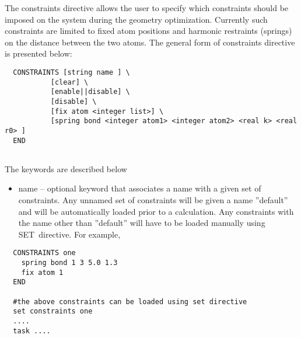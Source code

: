 \label{sec:constraints}

The constraints directive  allows the user to specify which constraints
should be imposed on the system during the geometry optimization. Currently
such constraints are limited to fixed atom positions and 
harmonic restraints (springs) on the distance between the two atoms. The
general form of constraints directive is presented below: 
\begin{verbatim}
  CONSTRAINTS [string name ] \
           [clear] \
           [enable||disable] \
           [disable] \
           [fix atom <integer list>] \
           [spring bond <integer atom1> <integer atom2> <real k> <real r0> ]
  END
          
\end{verbatim}
The keywords are described below 
\begin{itemize}
\item name -- optional keyword that associates a name with a given set of
constraints. Any unnamed set of constraints will be given a name ''default''
and will be automatically loaded prior to a calculation. Any constraints
with the name other than ''default''  will have to be loaded manually using
SET\ directive. For example,
\end{itemize}

\begin{verbatim}
  CONSTRAINTS one
    spring bond 1 3 5.0 1.3
    fix atom 1
  END
   
  #the above constraints can be loaded using set directive
  set constraints one
  ....
  task ....
\end{verbatim}

